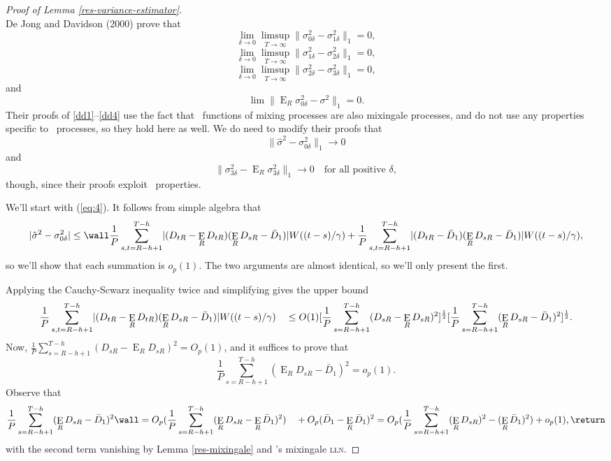 \documentclass[11pt]{article}
\DeclareMathOperator{\E}{E}
\newcommand{\citepos}[1]{\citeauthor{#1}'s \citeyearpar{#1}}
\newcommand{\oosSum}[2]{\ensuremath{\sum_{#1=R-\h+#2}^{T-\h}}}
\newcommand{\h}{h}
\newcommand{\vWeight}{W((t-s)/\gamma)}
\newcommand{\varianceTermI}{\ensuremath{\sigma_{0\delta}^2}}
\newcommand{\varianceTermII}{\ensuremath{\sigma_{1\delta}^2}}
\newcommand{\varianceTermIII}{\ensuremath{\sigma_{2\delta}^{2}}}
\newcommand{\varianceTermIV}{\ensuremath{\sigma_{3\delta}^{2}}}
\newcommand{\varianceDiffA}{\ensuremath{\frac1{P} \oosSum{s,t}{1}
    \lvert (D_{tR} - \E_R D_{tR})(\E_R D_{sR} - \bar D_1) \rvert
    \vWeight}}
\newcommand{\varianceDiffAi}{\ensuremath{\frac1P \oosSum{s}{1}(\E_R
    D_{sR} - \bar D_1 )^2}}
\newcommand{\varianceDiffAii}{\ensuremath{\frac1P \oosSum{s}{1}
    (D_{sR} - \E_R D_{sR})^2}}
\newcommand{\lln}{\textsc{lln}}
\begin{document}
\begin{proof}[Proof of Lemma \ref{res-variance-estimator}]
\begin{equation*}
\end{equation*}
De Jong and Davidson (2000) prove that
\begin{equation} \label{dd1}
\lim_{\delta\to0} \limsup_{T\to\infty} \lVert \varianceTermI -
\varianceTermII\rVert_1 = 0,
\end{equation}
\begin{equation} \label{dd2}
\lim_{\delta\to0} \limsup_{T\to\infty} \lVert \varianceTermII - \varianceTermIII
\rVert_1 = 0,
\end{equation}
\begin{equation} \label{dd3}
\lim_{\delta\to0} \limsup_{T\to\infty} \lVert \varianceTermIII - \varianceTermIV
\rVert_1 = 0,  
\end{equation}
and
\begin{equation} \label{dd4}
\lim \lVert \E_R \varianceTermI - \sigma^2 \rVert_1 = 0.
\end{equation}
Their proofs of \eqref{dd1}--\eqref{dd4} use the fact that \ned\
functions of mixing processes are also mixingale processes, and do not
use any properties specific to \ned\ processes, so they hold here as
well.  We do need to modify their proofs that
\begin{equation}
  \label{eq:4} \lVert \hat{\sigma}^2 - \varianceTermI \rVert_1 \to 0
\end{equation}
and
\begin{equation}
  \label{eq:5} \lVert \varianceTermIV - \E_R \varianceTermIV \rVert_1
  \to 0 \quad \text{for all positive $\delta$},
\end{equation}
though, since their proofs exploit \ned\ properties.

We'll start with (\ref{eq:4}). It follows from simple algebra that
\[
\lvert \hat\sigma^2 - \varianceTermI \rvert \leq \wall
\varianceDiffA \\ +
\frac1{P} \oosSum{s,t}{1} \lvert (D_{tR} - \bar D_1)(\E_R D_{sR} - \bar D_1) \rvert
\vWeight,
\]
so we'll show that each summation is $o_p(1)$.  The two
arguments are almost identical, so we'll only present the first.

Applying the Cauchy-Scwarz inequality twice and simplifying gives the
upper bound
\[
\varianceDiffA \\ \quad \leq O(1) [\varianceDiffAii]^{\frac12} [\varianceDiffAi]^{\frac12}.
\]
Now,
$\frac1P \oosSum{s}{1}(D_{sR} - \E_R D_{sR})^2 = O_p(1)$, and it suffices to prove
that \[\varianceDiffAi = o_p(1).\]  Observe that
\[
\varianceDiffAi \wall =  O_p(\frac1P \oosSum{s}{1}(\E_{R}D_{sR} -
\E_R\bar D_1)^2) \\
\quad + O_p(\bar D_1 - \E_R\bar D_1)^{2} \\
= O_p(\frac1P \oosSum{s}{1} (\E_RD_{sR})^2 - (\E_R\bar D_1)^2) + o_p(1),    \return
\]
with the second term vanishing by Lemma \ref{res-mixingale} and
\citepos{davidson_l1-convergence_1993} mixingale \lln.


\end{proof}
\end{document}
